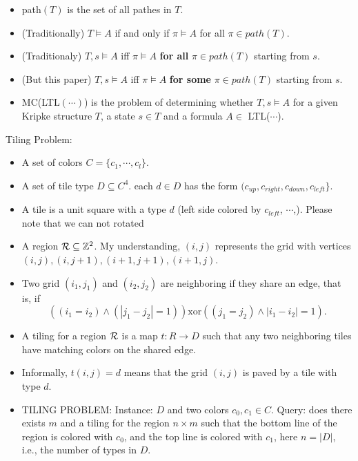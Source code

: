 \documentclass[12pt]{article}
\begin{document}
\begin{CJK*}{GBK}{song}
\begin{itemize}
\item path$(T)$ is the set of all pathes in $T$.

\item (Traditionally) $T\models A$ if and only if $\pi\models A$ for all $\pi\in path(T)$.
\item (Traditionaly) $T,s\models A$ iff $\pi\models A$ {\bf for all} $\pi\in path(T)$ starting from $s$.

\item (But this paper) $T,s\models A$ iff $\pi\models A$ {\bf for some} $\pi\in path(T)$ starting from $s$.

\item MC(LTL$(\cdots)$) is the problem of determining whether $T,s\models A$ for a given Kripke structure $T$, a state $s\in T$ and a formula $A\in$ LTL($\cdots$).
\end{itemize}

Tiling Problem:

\begin{itemize}
\item A set of colors $C=\{c_1,\cdots, c_l\}$.

\item A set of tile type $D\subseteq C^4$. each $d\in D$ has the form $(c_{up},c_{right}, c_{down},c_{left}\}$.

\item A tile is a unit square with a type $d$ (left side colored by $c_{left}$, $\cdots$,). Please note that we can not rotated

\item A region ${\cal R}\subseteq \mathbb{Z}^2$. My understanding, $(i,j)$ represents the grid with vertices $(i,j), (i,j+1), (i+1,j+1), (i+1,j)$.

\item Two grid $(i_1,j_1)$ and $(i_2,j_2)$ are neighboring if they share an edge, that is,  if $$((i_1=i_2)\wedge (|j_1-j_2|=1)) \mbox{xor} ((j_1=j_2)\wedge |i_1-i_2|=1).$$

\item A tiling for a region ${\cal R}$ is a map $t: R\rightarrow D$ such that any two neighboring tiles have matching colors on the shared edge.

\item Informally, $t(i,j)=d$ means that the grid $(i,j)$ is paved by a tile with type $d$.

\item TILING PROBLEM: Instance: $D$ and two colors $c_0, c_1\in C$. Query: does there exists $m$ and a tiling for the region $n\times m$ such that the bottom line of the region is colored with $c_0$, and the top line is colored with $c_1$, here $n=|D|$, i.e., the number of types in $D$. %


\end{itemize}
\end{CJK*}
\end{document}
